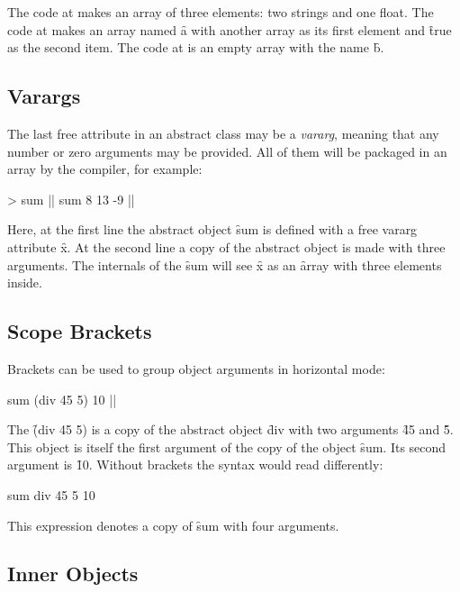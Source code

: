 The code at  makes an array of three elements: two strings
and one float. The code at  makes an array named \f{a} with another
array as its first element and \f{true} as the second item.
The code at  is an empty array with the name \f{b}.

\subsection{Varargs}

The last free attribute in an abstract class may be a \emph{vararg},
meaning that any number or zero arguments may be provided. All of them
will be packaged in an array by the compiler, for example:

\begin{eocode}
[x...] > sum |$\label{ln:sum-def}$|
sum 8 13 -9 |$\label{ln:sum-instance}$|
\end{eocode}

Here, at the first line the abstract object \f{sum} is defined
with a free vararg attribute \f{x}. At the second line a copy of the
abstract object is made with three arguments. The internals of
the \f{sum} will see \f{x} as an \f{array} with three
elements inside.

\subsection{Scope Brackets}

Brackets can be used to group object arguments in horizontal mode:

\begin{eocode}
sum (div 45 5) 10  |$\label{ln:sum}$|
\end{eocode}

The \f{(div 45 5)} is a copy of the abstract object \f{div}
with two arguments \f{45} and \f{5}. This object is itself
the first argument of the copy of the object \f{sum}. Its second
argument is \f{10}. Without brackets the syntax would read differently:

\begin{eocode}
sum div 45 5 10
\end{eocode}

This expression denotes a copy of \f{sum} with four arguments.

\subsection{Inner Objects}


